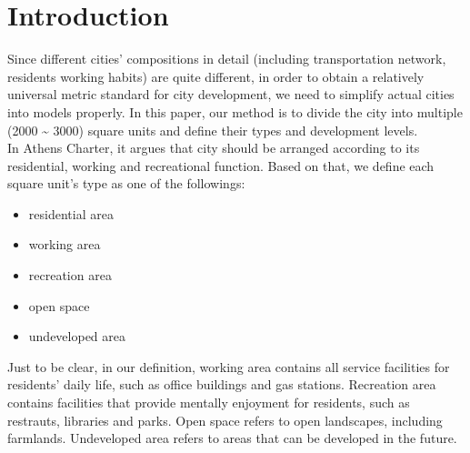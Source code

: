 \section{Introduction}
Since different cities' compositions in detail (including transportation network, residents working habits) are quite different, in order to obtain a relatively universal metric standard for city development, we need to simplify actual cities into models properly.
In this paper, our method is to divide the city into multiple (2000 \~{} 3000) square units and define their types and development levels.
\\
In Athens Charter, it argues that city should be arranged according to its residential, working and recreational function.
Based on that, we define each square unit's type as one of the followings:
\begin{itemize}
  \item residential area
  \item working area
  \item recreation area
  \item open space
  \item undeveloped area
\end{itemize}
Just to be clear, in our definition, working area contains all service facilities for residents' daily life, such as office buildings and gas stations.
Recreation area contains facilities that provide mentally enjoyment for residents, such as restrauts, libraries and parks.
Open space refers to open landscapes, including farmlands.
Undeveloped area refers to areas that can be developed in the future.
\\

